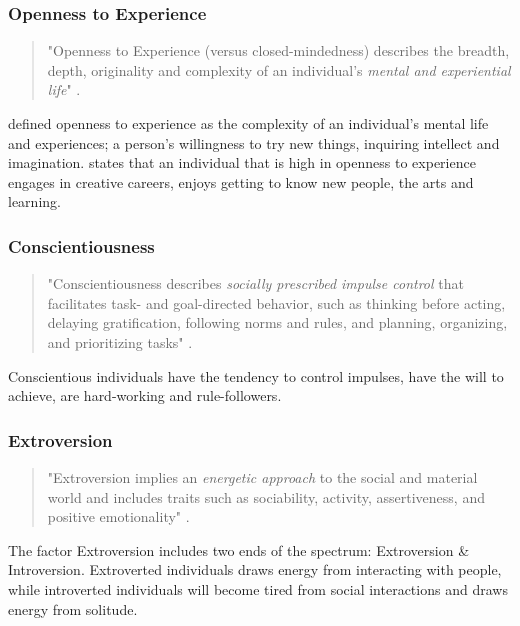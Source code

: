 \subsubsection{Openness to Experience}

\begin{quote}
    "Openness to Experience (versus closed-mindedness) describes the breadth, depth, originality and complexity of an individual's \textit{mental and experiential life}" \citep[p.121]{John1999}.
\end{quote}

\cite{John1999} defined openness to experience as the complexity of an individual's mental life and experiences; a person's willingness to try new things, inquiring intellect and imagination. \cite{Lebowitz2016} states that an individual that is high in openness to experience engages in creative careers, enjoys getting to know new people, the arts and learning.

\subsubsection{Conscientiousness}
\begin{quote}
    "Conscientiousness describes \textit{socially prescribed impulse control} that facilitates task- and goal-directed behavior, such as thinking before acting, delaying gratification, following norms and rules, and planning, organizing, and prioritizing tasks" \citep[p.121]{John1999}.
\end{quote}

Conscientious individuals have the tendency to control impulses, have the will to achieve, are hard-working and rule-followers.

\subsubsection{Extroversion}
\begin{quote}
    "Extroversion implies an \textit{energetic approach} to the social and material world and includes traits such as sociability, activity, assertiveness, and positive emotionality" \citep[p.121]{John1999}.

\end{quote}

The factor Extroversion includes two ends of the spectrum: Extroversion \& Introversion. Extroverted individuals draws energy from interacting with people, while introverted individuals will become tired from social interactions and draws energy from solitude.

